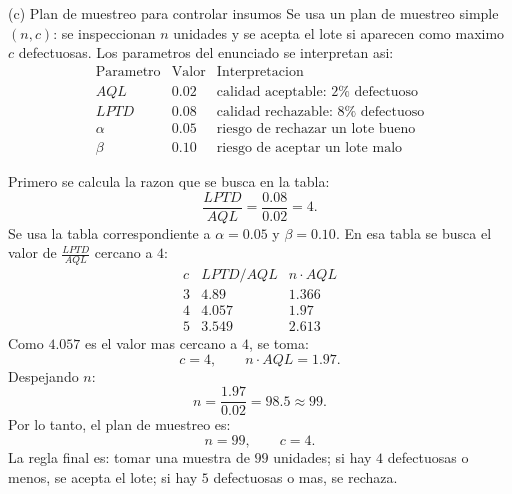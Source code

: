 \begin{respuesta}{(c) Plan de muestreo para controlar insumos}
Se usa un plan de muestreo simple \((n,c)\): se inspeccionan \(n\) unidades y se acepta el lote si aparecen como maximo \(c\) defectuosas. Los parametros del enunciado se interpretan asi:
\[
\begin{array}{c|c|c}
\text{Parametro} & \text{Valor} & \text{Interpretacion} \\
\hline
AQL & 0.02 & \text{calidad aceptable: }2\%\text{ defectuoso} \\
LPTD & 0.08 & \text{calidad rechazable: }8\%\text{ defectuoso} \\
\alpha & 0.05 & \text{riesgo de rechazar un lote bueno} \\
\beta & 0.10 & \text{riesgo de aceptar un lote malo}
\end{array}
\]

Primero se calcula la razon que se busca en la tabla:
\[
\frac{LPTD}{AQL}
=\frac{0.08}{0.02}
=4.
\]
Se usa la tabla correspondiente a \(\alpha=0.05\) y \(\beta=0.10\). En esa tabla se busca el valor de \(\frac{LPTD}{AQL}\) cercano a \(4\):
\[
\begin{array}{c|c|c}
c & LPTD/AQL & n\cdot AQL \\
\hline
3 & 4.89 & 1.366 \\
4 & 4.057 & 1.97 \\
5 & 3.549 & 2.613
\end{array}
\]
Como \(4.057\) es el valor mas cercano a \(4\), se toma:
\[
c=4,
\qquad
n\cdot AQL=1.97.
\]
Despejando \(n\):
\[
n=\frac{1.97}{0.02}=98.5\approx 99.
\]
Por lo tanto, el plan de muestreo es:
\[
\boxed{n=99,\qquad c=4.}
\]
La regla final es: tomar una muestra de \(99\) unidades; si hay \(4\) defectuosas o menos, se acepta el lote; si hay \(5\) defectuosas o mas, se rechaza.
\end{respuesta}
